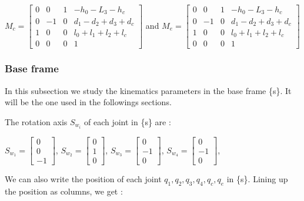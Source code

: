 \bigbreak
\begin{center}
    $
    M_c = \begin{bmatrix}
        0 & 0 & 1 & -h_0-L_3-h_c\\
        0 & -1 & 0 & d_1-d_2+d_3+d_c\\
        1 & 0 & 0 & l_0+l_1+l_2+l_c\\
        0 & 0 & 0 & 1
    \end{bmatrix}
    $
    and
    $
    M_e = \begin{bmatrix}
        0 & 0 & 1 & -h_0-L_3-h_c\\
        0 & -1 & 0 & d_1-d_2+d_3+d_c\\
        1 & 0 & 0 & l_0+l_1+l_2+l_c\\
        0 & 0 & 0 & 1
    \end{bmatrix}
    $
\end{center}

\subsubsection{Base frame}

In this subsection we study the kinematics parameters in the base frame \{s\}. It will be the one used in the followings sections.

\bigbreak
The rotation axis $S_{w_i}$ of each joint  in \{s\} are : 
\begin{center}
    $S_{w_1} = \begin{bmatrix} 0 \\ 0 \\ -1\end{bmatrix}$,
    $S_{w_2} = \begin{bmatrix} 0 \\ 1 \\ 0\end{bmatrix}$,
    $S_{w_3} = \begin{bmatrix} 0 \\ -1 \\ 0\end{bmatrix}$,
    $S_{w_4} = \begin{bmatrix} 0 \\ -1 \\ 0\end{bmatrix}$,
\end{center}

\bigbreak
We can also write the position of each joint  $q_1,q_2,q_3,q_4,q_c,q_e$ in \{s\}. Lining up the position as columns, we get : 

